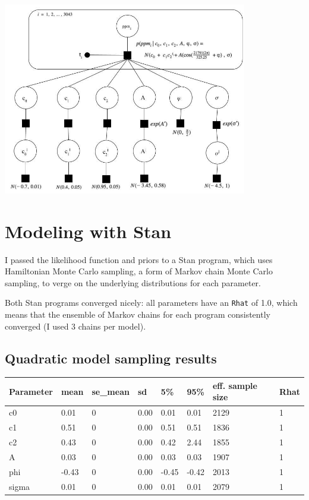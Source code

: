 \documentclass[]{article}
\let\origfigure=\figure
\let\endorigfigure=\endfigure
\renewenvironment{figure}[1][]{%
  \origfigure[H]
}{%
  \endorigfigure
}
\begin{document}
\begin{figure}
\centering
\includegraphics[width=0.8\textwidth]{mauna_loa/exponential_graph.png}
\caption{Exponential likelihood graphical model.}
\end{figure}

\hypertarget{modeling-with-stan}{%
\section{Modeling with Stan}\label{modeling-with-stan}}

I passed the likelihood function and priors to a Stan program, which
uses Hamiltonian Monte Carlo sampling, a form of Markov chain Monte
Carlo sampling, to verge on the underlying distributions for each
parameter. \newline

Both Stan programs converged nicely: all parameters have an
\texttt{Rhat} of 1.0, which means that the ensemble of Markov chains for
each program consistently converged (I used 3 chains per model).

\hypertarget{quadratic-model-sampling-results}{%
\subsection{Quadratic model sampling
results}\label{quadratic-model-sampling-results}}

\begin{longtable}[]{@{}llllllll@{}}
\toprule
Parameter & mean & se\_mean & sd & 5\% & 95\% & eff. sample size &
Rhat\tabularnewline
\midrule
\endhead
c0 & 0.01 & 0 & 0.00 & 0.01 & 0.01 & 2129 & 1\tabularnewline
c1 & 0.51 & 0 & 0.00 & 0.51 & 0.51 & 1836 & 1\tabularnewline
c2 & 0.43 & 0 & 0.00 & 0.42 & 2.44 & 1855 & 1\tabularnewline
A & 0.03 & 0 & 0.00 & 0.03 & 0.03 & 1907 & 1\tabularnewline
phi & -0.43 & 0 & 0.00 & -0.45 & -0.42 & 2013 & 1\tabularnewline
sigma & 0.01 & 0 & 0.00 & 0.01 & 0.01 & 2079 & 1\tabularnewline
\bottomrule
\end{longtable}
\end{document}
